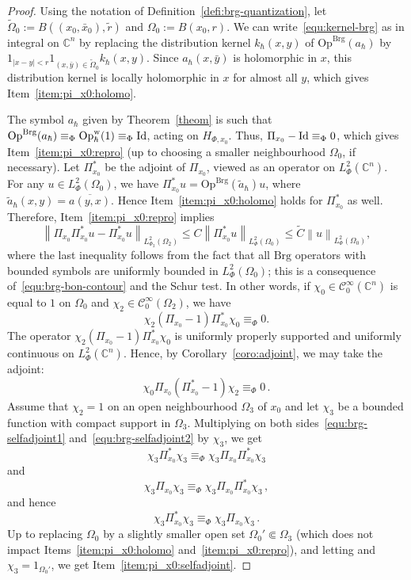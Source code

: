 \documentclass{article}
\newcommand{\Op}{\mathrm{Op}}
\newcommand{\Brg}{\mathrm{Brg}}
\newcommand{\w}{\mathrm{w}}
\newcommand{\abs}[1]{\left|#1\right|}
\newcommand{\norm}[1]{\left\|#1\right\|}
\newcommand{\Opbrg}{\Op^{\Brg}}
\newcommand{\lphi}{L^2_\Phi}
\newcommand{\Cinf}{\mathscr{C}^\infty}
\newcommand{\CM}{\mathbb{C}}
\newcommand{\h}{\hbar}
\newcommand{\hnegl}{\equiv_\Phi}
\begin{document}
\begin{proof}
  Using the notation of Definition~\ref{defi:brg-quantization}, let
  $\tilde\Omega_0 := B((x_0,\bar x_0), \tilde r)$ and
  $\Omega_0:=B(x_0,r)$. We can write~\eqref{equ:kernel-brg} as in
  integral on $\CM^n$ by replacing the distribution kernel $k_\h(x,y)$
  of $\Opbrg(a_\h)$ by
  $1_{\abs{x-y}<r} 1_{(x,\bar y)\in \tilde \Omega_0} k_\h(x,y)$.
  Since $a_\h(x,\bar y)$ is holomorphic in $x$, this distribution
  kernel is locally holomorphic in $x$ for almost all $y$, which gives
  Item~\ref{item:pi_x0:holomo}.

  The symbol $a_\h$ given by Theorem~\ref{theom} is such that
  $\Opbrg(a_\h)\hnegl \Op^{\w}_\h(1)\hnegl\textup{Id}$, acting on
  $H_{\Phi,x_0}$.  Thus, $\Pi_{x_0}-\textup{Id} \hnegl 0$, which gives
  Item~\ref{item:pi_x0:repro} (up to choosing a smaller neighbourhood
  $\Omega_0$, if necessary).  Let $\Pi_{x_0}^*$ be the adjoint of
  $\Pi_{x_0}$, viewed as an operator on $\lphi(\CM^n)$.  For any
  $u\in \lphi(\Omega_0)$, we have
  $\Pi_{x_0}^* u = \Opbrg(\tilde a_\h)u$, where
  $\tilde{a}_\h(x,y) = \overline{a(y,x)}$. Hence
  Item~\ref{item:pi_x0:holomo} holds for $\Pi_{x_0}^*$ as
  well. Therefore, Item~\ref{item:pi_x0:repro} implies
  \begin{equation}
    \norm{\Pi_{x_0} \Pi_{x_0}^*u - \Pi_{x_0}^*u}_{L^2_{\Phi_2}(\Omega_2)}
    \leq C \norm{\Pi_{x_0}^*u}_{\lphi(\Omega_0)} \leq \tilde C
    \norm{u}_{\lphi(\Omega_0)},
  \end{equation}
  where the last inequality follows from the fact that all $\Brg$
  operators with bounded symbols are uniformly bounded in
  $\lphi(\Omega_0)$; this is a consequence
  of~\eqref{equ:brg-bon-contour} and the Schur test. In other words,
  if $\chi_0\in\Cinf_0(\CM^n)$ is equal to $1$ on $\Omega_0$ and
  $\chi_2\in\Cinf_0(\Omega_2)$, we have
  \begin{equation}
    \label{equ:brg-selfadjoint1}
    \chi_2 (\Pi_{x_0} - 1)\Pi_{x_0}^* \chi_0 \equiv_\Phi 0.
  \end{equation}
  The operator $\chi_2 (\Pi_{x_0} - 1)\Pi_{x_0}^* \chi_0$ is uniformly
  properly supported and uniformly continuous on $\lphi(\CM^n)$.
  Hence, by Corollary~\ref{coro:adjoint}, we may take the adjoint:
  \begin{equation}
    \label{equ:brg-selfadjoint2}
    \chi_0 \Pi_{x_0}(\Pi_{x_0}^* - 1) \chi_2\equiv_\Phi 0\,.
  \end{equation}
  Assume that $\chi_2=1$ on an open neighbourhood $\Omega_3$ of $x_0$
  and let $\chi_3$ be a bounded function with compact support in
  $\Omega_3$. Multiplying on both sides~\eqref{equ:brg-selfadjoint1}
  and~\eqref{equ:brg-selfadjoint2} by $\chi_3$, we get
  \[
  \chi_3 \Pi_{x_0}^* \chi_3 \equiv_\Phi \chi_3 \Pi_{x_0}\Pi_{x_0}^* \chi_3
  \]
  and
  \[
  \chi_3 \Pi_{x_0} \chi_3 \equiv_\Phi \chi_3 \Pi_{x_0}\Pi_{x_0}^* \chi_3\,,
  \]
  and hence
  \[
  \chi_3\Pi_{x_0}^* \chi_3 \equiv_\Phi \chi_3\Pi_{x_0} \chi_3\,.
  \]
  Up to replacing $\Omega_0$ by a slightly smaller open set
  $\Omega_0'\Subset\Omega_3$ (which does not impact
  Items~\ref{item:pi_x0:holomo} and~\ref{item:pi_x0:repro}), and
  letting and $\chi_3=1_{\Omega_0'}$, we get
  Item~\ref{item:pi_x0:selfadjoint}.



\end{proof}
\end{document}
